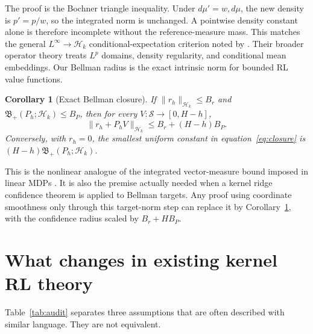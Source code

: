 \documentclass{article}
\newtheorem{corollary}[theorem]{Corollary}
\newcommand{\cH}{\mathcal H_k}
\newcommand{\cS}{\mathcal S}
\newcommand{\Bpos}{\mathfrak B_{+}}
\begin{document}
The proof is the Bochner triangle inequality. Under $d\mu'=w,d\mu$, the new density is $p'=p/w$, so the integrated norm is unchanged. A pointwise density constant alone is therefore incomplete without the reference-measure mass. This matches the general $L^\infty\!\to\cH$ conditional-expectation criterion noted by \citet{hertel2026regularity}. Their broader operator theory treats $L^p$ domains, density regularity, and conditional mean embeddings. Our Bellman radius is the exact intrinsic norm for bounded RL value functions.

\begin{corollary}[Exact Bellman closure]
\label{cor:closure}
If $\|r_h\|_{\cH}\leq B_r$ and $\Bpos(P_h;\cH)\leq B_P$, then for every $V:\cS\to[0,H-h]$,
\begin{equation}
 \|r_h+P_hV\|_{\cH}\leq B_r+(H-h)B_P.
 \label{eq:closure}
\end{equation}
Conversely, with $r_h=0$, the smallest uniform constant in equation~\eqref{eq:closure} is $(H-h)\Bpos(P_h;\cH)$.
\end{corollary}

This is the nonlinear analogue of the integrated vector-measure bound imposed in linear MDPs \citep{jin2020linear}. It is also the premise actually needed when a kernel ridge confidence theorem is applied to Bellman targets. Any proof using coordinate smoothness only through this target-norm step can replace it by Corollary~\ref{cor:closure}, with the confidence radius scaled by $B_r+HB_P$.

\section{What changes in existing kernel RL theory}
\label{sec:audit}

Table~\ref{tab:audit} separates three assumptions that are often described with similar language. They are not equivalent.
\end{document}
